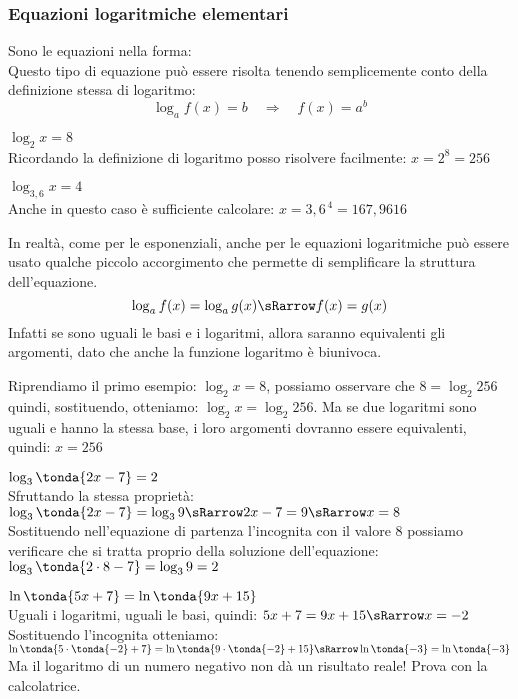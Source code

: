 \subsubsection{Equazioni logaritmiche elementari}
\label{subsubsec:esplog_eq_log_elementari}

\noindent Sono le equazioni nella forma: \quad {} 
\\[7pt]
Questo tipo di equazione può essere risolta tenendo semplicemente conto 
della definizione stessa di logaritmo:
\[\log_a{f(x)} = b \quad \Rightarrow \quad f(x)=a^b\]
\begin{esempio}
 \(\log_2{x} = 8\)\\[4pt] 
 Ricordando la definizione di logaritmo posso risolvere facilmente: \; \(x 
= 2^8 = 256\)
\end{esempio}
\begin{esempio}
 \(\log_{3,6}{x} = 4\)\\[4pt]
 Anche in questo caso è sufficiente calcolare: \quad \( x = 3,6^{\,4} = 
167,9616\)
\end{esempio}

In realtà, come per le esponenziali, anche per le equazioni logaritmiche 
può essere usato qualche piccolo
accorgimento che permette di semplificare la struttura dell'equazione.
\[\log_a{f(x)} = \log_a{g(x)} \sRarrow f(x) = g(x)\]
Infatti se sono uguali le basi e i logaritmi, allora saranno equivalenti 
gli argomenti, dato che anche la funzione logaritmo è biunivoca.

\begin{esempio}
 Riprendiamo il primo esempio: \(\log_2{x} = 8\), possiamo osservare che 
 \(8 = \log_2{256}\) quindi, sostituendo, 
 otteniamo: \(\log_2{x} = \log_2{256}\). Ma se due logaritmi sono uguali e 
hanno la stessa base, i loro argomenti dovranno essere equivalenti, quindi:
\(x = 256\)
\end{esempio}

\begin{esempio}
 \(\log_{3}\tonda{2x-7} = 2 \)\\[4pt]
 Sfruttando la stessa proprietà: 
 \(\log_{3}\tonda{2x-7} = \log_{3}9 \sRarrow  
2x -7 = 9 \sRarrow x = 8\)
\\[4pt] 
Sostituendo nell'equazione di partenza l'incognita con il valore 8 
possiamo verificare che si tratta proprio della soluzione dell'equazione:
\(\log_{3}\tonda{2 \cdot 8-7} = \log_{3} 9 = 2\)
\end{esempio}

\begin{esempio}
 \(\ln\tonda{5x +7} = \ln\tonda{9x +15}\) \\[4pt]
 Uguali i logaritmi, uguali le basi, quindi:
 \(5x +7 = 9x +15  \sRarrow x = -2\) \\[4pt]
Sostituendo l'incognita otteniamo:
 \(\ln\tonda{5 \cdot \tonda{-2} +7} = 
   \ln\tonda{9 \cdot \tonda{-2} +15} \sRarrow 
   \ln\tonda{-3} = \ln\tonda{-3}\) \\[4pt]
 Ma il logaritmo di un numero negativo non dà un risultato reale! Prova con 
la calcolatrice.
\end{esempio}

